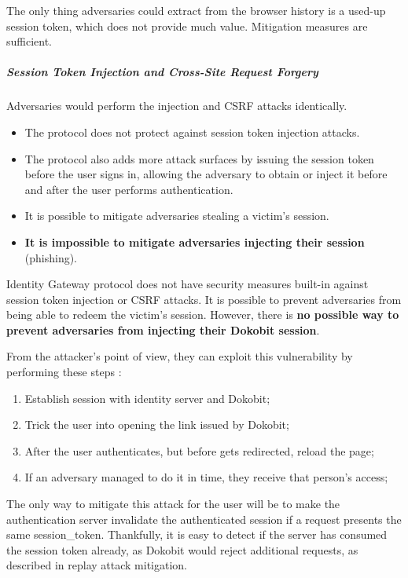 The only thing adversaries could extract from the browser history is a used-up session token, which does not provide much value. Mitigation measures are sufficient.

\subparagraph{Session Token Injection and Cross-Site Request Forgery}

Adversaries would perform the injection and CSRF attacks identically.

\begin{itemize}
  \item The protocol does not protect against session token injection attacks.
  \item The protocol also adds more attack surfaces by issuing the session token before the user signs in, allowing the adversary to obtain or inject it before and after the user performs authentication.
  \item It is possible to mitigate adversaries stealing a victim's session.
  \item \textbf{It is impossible to mitigate adversaries injecting their session} (phishing).
\end{itemize}

Identity Gateway protocol does not have security measures built-in against session token injection or CSRF attacks. It is possible to prevent adversaries from being able to redeem the victim's session. However, there is \textbf{no possible way to prevent adversaries from injecting their Dokobit session}.

From the attacker's point of view, they can exploit this vulnerability by performing these steps \cite{video-exploitdokobit}:

\begin{enumerate}
  \item Establish session with identity server and Dokobit;
  \item Trick the user into opening the link issued by Dokobit;
  \item After the user authenticates, but before gets redirected, reload the page;
  \item If an adversary managed to do it in time, they receive that person's access;
\end{enumerate}

The only way to mitigate this attack for the user will be to make the authentication server invalidate the authenticated session if a request presents the same session\_token. Thankfully, it is easy to detect if the server has consumed the session token already, as Dokobit would reject additional requests, as described in replay attack mitigation.

